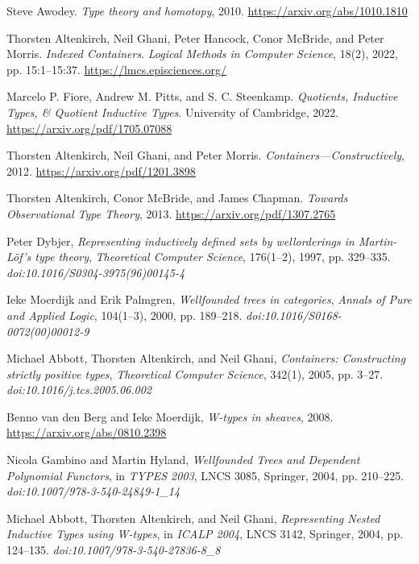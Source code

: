 \documentclass{article}
\theoremstyle{definition}
\begin{document}
\begin{thebibliography}{99}
Steve Awodey.
\textit{Type theory and homotopy},
2010.
\url{https://arxiv.org/abs/1010.1810}

Thorsten Altenkirch, Neil Ghani, Peter Hancock, Conor McBride, and Peter Morris.
\textit{Indexed Containers}.
\textit{Logical Methods in Computer Science}, 18(2), 2022, pp. 15:1--15:37.
\url{https://lmcs.episciences.org/}

Marcelo P. Fiore, Andrew M. Pitts, and S. C. Steenkamp.
\textit{Quotients, Inductive Types, \& Quotient Inductive Types}.
University of Cambridge, 2022.
\url{https://arxiv.org/pdf/1705.07088}

Thorsten Altenkirch, Neil Ghani, and Peter Morris.
\textit{Containers—Constructively},
2012.
\url{https://arxiv.org/pdf/1201.3898}

Thorsten Altenkirch, Conor McBride, and James Chapman.
\textit{Towards Observational Type Theory},
2013.
\url{https://arxiv.org/pdf/1307.2765}

Peter Dybjer,
\textit{Representing inductively defined sets by wellorderings in Martin-Löf’s type theory},
\textit{Theoretical Computer Science}, 176(1–2), 1997, pp. 329–335.
\textit{doi:10.1016/S0304-3975(96)00145-4}

Ieke Moerdijk and Erik Palmgren,
\textit{Wellfounded trees in categories},
\textit{Annals of Pure and Applied Logic}, 104(1–3), 2000, pp. 189–218.
\textit{doi:10.1016/S0168-0072(00)00012-9}

Michael Abbott, Thorsten Altenkirch, and Neil Ghani,
\textit{Containers: Constructing strictly positive types},
\textit{Theoretical Computer Science}, 342(1), 2005, pp. 3–27.
\textit{doi:10.1016/j.tcs.2005.06.002}

Benno van den Berg and Ieke Moerdijk,
\textit{W-types in sheaves},
2008.
\url{https://arxiv.org/abs/0810.2398}

Nicola Gambino and Martin Hyland,
\textit{Wellfounded Trees and Dependent Polynomial Functors},
in \textit{TYPES 2003}, LNCS 3085, Springer, 2004, pp. 210–225.
\textit{doi:10.1007/978-3-540-24849-1\_14}

Michael Abbott, Thorsten Altenkirch, and Neil Ghani,
\textit{Representing Nested Inductive Types using W-types},
in \textit{ICALP 2004}, LNCS 3142, Springer, 2004, pp. 124–135.
\textit{doi:10.1007/978-3-540-27836-8\_8}


\end{thebibliography}
\end{document}
